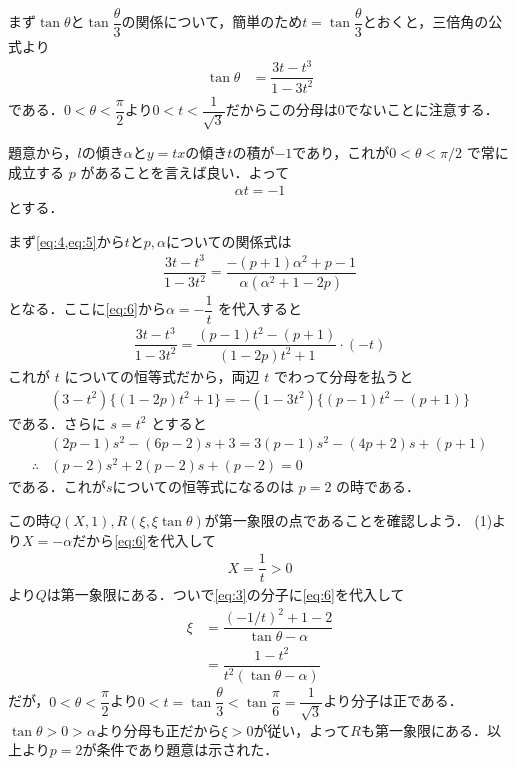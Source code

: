 \documentclass[../../main.tex]{subfiles}
\begin{document}
まず$\tan\theta$と$\tan\dfrac{\theta}{3}$の関係について，簡単のため$t=\tan\dfrac{\theta}{3}$とおくと，三倍角の公式より
\begin{align}
  \tan\theta &= \dfrac{3t - t^3}{1 - 3t^2} \label{eq:5}
\end{align}
である．$0<\theta<\dfrac{\pi}{2}$より$0<t<\dfrac{1}{\sqrt{3}}$だからこの分母は$0$でないことに注意する．

題意から，$l$の傾き$\alpha$と$y=tx$の傾き$t$の積が$-1$であり，これが$0 < \theta < \pi/2$ で常に成立する $p$ があることを言えば良い．よって
\begin{align}
  \alpha t = -1 \label{eq:6}
\end{align}
とする．

まず\cref{eq:4,eq:5}から$t$と$p,\alpha$についての関係式は
\begin{align}
  \dfrac{3t - t^3}{1 - 3t^2}
  = \dfrac{-(p+1)\alpha^2 + p - 1}{\alpha(\alpha^2 + 1 - 2p)} \label{eq:7}
\end{align}
となる．ここに\cref{eq:6}から$\alpha = -\dfrac{1}{t}$ を代入すると
\begin{align}
  \dfrac{3t - t^3}{1 - 3t^2} = \dfrac{(p-1)t^2 - (p+1)}{(1 - 2p)t^2 + 1} \cdot (-t)
\end{align}
これが $t$ についての恒等式だから，両辺 $t$ でわって分母を払うと
\begin{align}
  (3 - t^2)\{(1 - 2p)t^2 + 1\} = -(1 - 3t^2)\{(p - 1)t^2 - (p + 1)\} \label{eq:8}
\end{align}
である．さらに $s = t^2$ とすると
\begin{align}
  & (2p - 1)s^2 - (6p - 2)s + 3 = 3(p - 1)s^2 - (4p + 2)s + (p + 1) \\
  \therefore
  & (p - 2)s^2 + 2(p - 2)s + (p - 2) = 0 \label{eq:9}
\end{align}
である．これが$s$についての恒等式になるのは $p=2$ の時である．

この時$Q(X,1),R(\xi,\xi\tan\theta)$が第一象限の点であることを確認しよう．
(1)より$X=-\alpha$だから\cref{eq:6}を代入して
\begin{align}
  X = \dfrac{1}{t} > 0
\end{align}
より$Q$は第一象限にある．ついで\cref{eq:3}の分子に\cref{eq:6}を代入して
\begin{align}
  \xi
  & = \dfrac{(-1/t)^2 + 1 - 2}{\tan\theta - \alpha} \\
  & = \dfrac{1-t^2}{t^2(\tan\theta - \alpha)}
\end{align}
だが，$0<\theta<\dfrac{\pi}{2}$より$0<t=\tan\dfrac{\theta}{3}<\tan\dfrac{\pi}{6}=\dfrac{1}{\sqrt{3}}$より分子は正である．$\tan\theta>0>\alpha$より分母も正だから$\xi>0$が従い，よって$R$も第一象限にある．以上より$p=2$が条件であり題意は示された．
\end{document}
